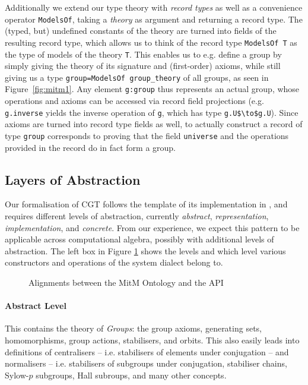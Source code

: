 Additionally we extend our type theory with \emph{record types} as well as a
convenience operator \lstinline|ModelsOf|, taking a \emph{theory} as argument
and returning a record type. The (typed, but) undefined constants of the theory
are turned into fields of the resulting record type, which allows us to think of
the record type \lstinline|ModelsOf T| as the type of models of the theory
\lstinline|T|. This enables us to e.g. define a group by simply giving the
theory of its signature and (first-order) axioms, while still giving us a type
\lstinline|group=ModelsOf group_theory| of all groups, as seen in
Figure~\ref{fig:mitm1}. Any element \lstinline|g:group| thus represents an
actual group, whose operations and axioms can be accessed via record field
projections (e.g. \lstinline|g.inverse| yields the inverse operation of
\lstinline|g|, which has type \lstinline[mathescape]|g.U$\to$g.U|). Since axioms
are turned into record type fields as well, to actually construct a record of
type \lstinline|group| corresponds to proving that the field
\lstinline|universe| and the operations provided in the record do in fact form a
group.

\subsection{Layers of Abstraction}

Our formalisation of CGT follows the template of its implementation in \GAP, and
requires different levels of abstraction, currently \emph{abstract},
\emph{representation}, \emph{implementation}, and \emph{concrete}. From our
experience, we expect this pattern to be applicable across computational
algebra, possibly with additional levels of abstraction. The left box in Figure
\ref{fig:cgtontology} shows the levels and which level various constructors and
operations of the \GAP system dialect belong to.

\begin{figure}[ht]\centering
  \caption{Alignments between the MitM Ontology and the \GAP API}\label{fig:cgtontology}
\end{figure}

\paragraph{Abstract Level} This contains the theory of \emph{Groups}: the group
axioms, generating sets, homomorphisms, group actions, stabilisers, and orbits.
This also easily leads into definitions of centralisers -- i.e. stabilisers of
elements under conjugation -- and normalisers -- i.e. stabilisers of subgroups
under conjugation, stabiliser chains, Sylow-$p$ subgroups, Hall subroups, and
many other concepts.

